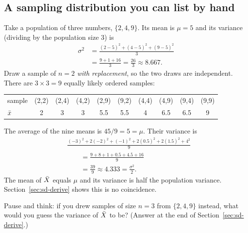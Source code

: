 \subsection{A sampling distribution you can list by hand}

Take a population of three numbers, $\{2,4,9\}$. Its mean is $\mu=5$ and its
variance (dividing by the population size 3) is
\begin{align*}
\sigma^2 &= \frac{(2-5)^2+(4-5)^2+(9-5)^2}{3} \\
&= \frac{9+1+16}{3} = \frac{26}{3} \approx 8.667.
\end{align*}
Draw a sample of $n=2$ \emph{with replacement}, so the two draws are independent.
There are $3\times 3=9$ equally likely ordered samples:

\begin{center}
\begin{tabular}{lccccccccc}
\toprule
sample & (2,2) & (2,4) & (4,2) & (2,9) & (9,2) & (4,4) & (4,9) & (9,4) & (9,9)\\
$\bar{x}$ & 2 & 3 & 3 & 5.5 & 5.5 & 4 & 6.5 & 6.5 & 9\\
\bottomrule
\end{tabular}
\end{center}

The average of the nine means is $45/9=5=\mu$. Their variance is
\begin{align*}
&\frac{(-3)^2+2(-2)^2+(-1)^2+2(0.5)^2+2(1.5)^2+4^2}{9} \\
&\qquad = \frac{9+8+1+0.5+4.5+16}{9} \\
&\qquad = \frac{39}{9} \approx 4.333 = \frac{\sigma^2}{2}.
\end{align*}
The mean of $\bar{X}$ equals $\mu$ and its variance is half the population variance.
Section~\ref{sec:sd-derive} shows this is no coincidence.

\begin{recoverybox}
Pause and think: if you drew samples of size $n=3$ from $\{2,4,9\}$ instead, what
would you guess the variance of $\bar{X}$ to be? (Answer at the end of
Section~\ref{sec:sd-derive}.)
\end{recoverybox}

